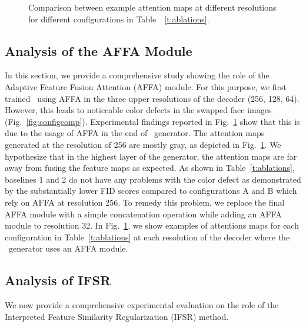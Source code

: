 \documentclass[10pt,twocolumn,letterpaper]{article}
\newcommand{\fti}[1]{\textit{FaceDancer}{#1}}
\begin{document}
\begin{figure}
\caption{Comparison between example attention maps at different resolutions for different configurations in Table~~\ref{t:ablations}.}
\label{fig:atterr}
\end{figure}
\subsection{Analysis of the AFFA Module}

In this section, we provide a comprehensive study showing the role of the   Adaptive Feature Fusion Attention (AFFA) module. 
For this purpose, we first  trained \fti~using AFFA in the three upper resolutions of the decoder (256, 128, 64). However, this leads to noticeable color defects in the swapped face images (Fig.~\ref{fig:configcomp}). 
Experimental findings reported in Fig.~\ref{fig:atterr} show that this is due to the usage of AFFA in the end of \fti~generator. 
The attention maps generated at the resolution of 256 are mostly gray, as depicted in Fig.~\ref{fig:atterr}.
We hypothesize that in the highest layer of the generator, the attention maps are far away from fusing the feature maps as expected.
As shown in Table~\ref{t:ablations}, baselines 1 and 2  do not have any problems with the color defect as demonstrated by the substantially lower FID scores compared to configurations A and B which  rely on AFFA at resolution 256. 
To remedy this problem, we replace the final AFFA module with a simple concatenation operation while adding an AFFA module to resolution 32.
In Fig.~\ref{fig:atterr}, we show examples of attentions maps for each configuration in Table~\ref{t:ablations} at each resolution of the decoder where the \fti~generator uses an AFFA module.


\subsection{Analysis of IFSR}

We now provide a comprehensive experimental evaluation on the role of the  Interpreted Feature Similarity Regularization  (IFSR) method. 
\end{document}
